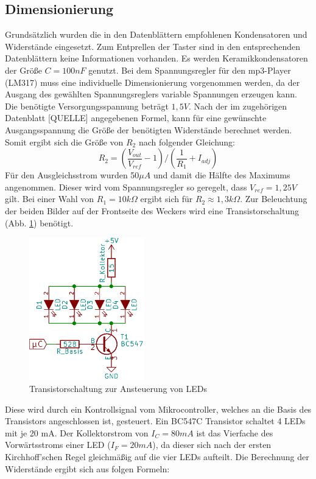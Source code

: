 \documentclass[journal, a4paper]{IEEEtran}
\begin{document}
		\subsection{Dimensionierung}
			\label{sc:Hardware:subsc:Dimensionierung}
			Grundsätzlich wurden die in den Datenblättern empfohlenen Kondensatoren und Widerstände eingesetzt. Zum Entprellen der Taster sind in den entsprechenden Datenblättern keine Informationen vorhanden. Es werden Keramikkondensatoren der Größe $C=100 nF$ genutzt. Bei dem Spannungsregler für den mp3-Player (LM317) muss eine individuelle Dimensionierung vorgenommen werden, da der Ausgang des gewählten Spannungsreglers variable Spannungen erzeugen kann.
			Die benötigte Versorgungsspannung beträgt $1,5 V$. Nach der im zugehörigen Datenblatt [QUELLE] angegebenen Formel, kann für eine gewünschte Ausgangsspannung die Größe der benötigten Widerstände berechnet werden.  Somit ergibt sich die Größe von $R_2$ nach folgender Gleichung:
			\begin{equation}
				\label{eqn:1,5VDC}
				R_2 = (\frac{V_{out}}{V_{ref}}-1) / (\frac{1}{R_1}+I_{adj})
			\end{equation}	
			Für den Ausgleichsstrom wurden 50$\mu A$ und damit die Hälfte des Maximums angenommen. Dieser wird vom Spannungsregler so geregelt, dass $V_{ref} = 1,25 V$ gilt. Bei einer Wahl von $R_1 = 10k\Omega$ ergibt sich für $R_2 \approx 1,3 k\Omega$.
			Zur Beleuchtung der beiden Bilder auf der Frontseite des Weckers wird eine Transistorschaltung (Abb. \ref{fig:Transistor}) benötigt. 
			\begin{figure}
				\begin{center}	
					\includegraphics[width=5cm]{./Grafiken/Transistor.png}
					\caption{Transistorschaltung zur Ansteuerung von LEDs}
					\label{fig:Transistor}
				\end{center}
			\end{figure}
			Diese wird durch ein Kontrollsignal vom Mikrocontroller, welches an die Basis des Transistors angeschlossen ist, gesteuert. Ein BC547C Transistor schaltet 4 LEDs mit je 20 mA. Der Kollektorstrom von $I_C=80mA$ ist das Vierfache des Vorwärtsstroms einer LED ($I_F=20mA$), da dieser sich nach der ersten Kirchhoff'schen Regel gleichmäßig auf die vier LEDs aufteilt. Die Berechnung der Widerstände ergibt sich aus folgen Formeln: 
\end{document}
